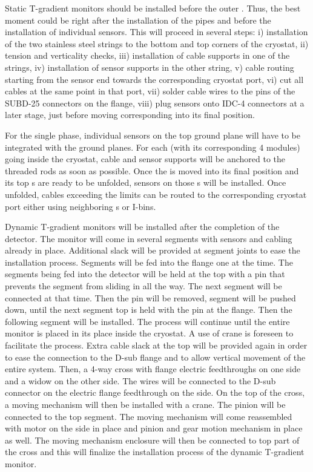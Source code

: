 Static T-gradient monitors should be installed before the outer . Thus, the best moment could be right after the installation of the pipes
and before the installation of individual sensors. This will proceed in several steps: i) installation of the two stainless steel strings to the bottom and top corners of the cryostat,
ii) tension and verticality checks, iii) installation of cable supports in one of the strings, iv) installation of sensor supports in the other string, v) cable routing starting from
the sensor end towards the corresponding cryostat port, vi) cut all cables at the same point in that port, vii) solder cable wires to the pins of the SUBD-25 connectors on the flange,
viii) plug sensors onto IDC-4 connectors at a later stage, just before moving corresponding  into its final position. 

For the single phase, individual sensors on the top ground plane will have to be integrated with the ground planes. For each  (with its corresponding 4  modules)
going inside the cryostat, cable and sensor supports will be anchored to the  threaded rods as soon as possible.
Once the  is moved into its final position and its top s are ready to be unfolded, sensors on those s will be installed. Once unfolded, cables 
exceeding the  limits can be routed to the corresponding cryostat port either using neighboring s or  I-bins. 


Dynamic T-gradient monitors will be installed after the completion of the detector.
The monitor will come in several segments with sensors and cabling already
in place. Additional slack will be provided at segment joints to ease the
installation process. Segments will be fed into the flange one at the
time. The segments being fed into the detector will be held at the top
with a pin that prevents the segment from sliding in all the way. The next
segment will be connected at that time. Then the pin will be removed,
segment will be pushed down, until the next segment top is held with the
pin at the flange. Then the following segment will be installed. The
process will continue until the entire monitor is placed in its place
inside the cryostat. A use of crane is foreseen to facilitate the process.
Extra cable slack at the top will be provided again in order to ease  the
connection to the D-sub flange and to allow  vertical movement of the
entire system. Then,  a 4-way cross with flange electric feedthroughs on
one side and a widow on the other side. The wires will  be connected to
the D-sub connector on the electric flange feedthrough on the side. On the
top of the cross, a moving mechanism will then be installed with a crane.
The pinion will be connected to the top segment. The moving mechanism will
come reassembled with motor on the side in place and pinion and gear
motion mechanism in place as well. The moving mechanism enclosure  will
then be connected to top part of the cross and this will finalize the
installation process of the dynamic T-gradient monitor.

